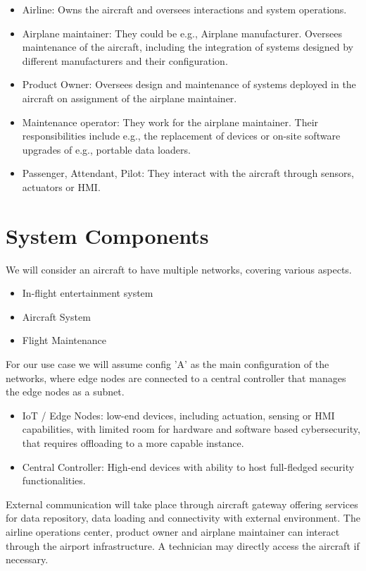 \begin{itemize}
	\item Airline:
	      Owns the aircraft and oversees interactions and system operations.
	\item Airplane maintainer: They could be e.g., Airplane manufacturer. Oversees maintenance of the aircraft,
	      including the integration of systems designed by different manufacturers and their configuration.
	\item Product Owner: Oversees design and maintenance of systems deployed in the aircraft on assignment of the
	      airplane maintainer.
	\item Maintenance operator: They work for the airplane maintainer. Their responsibilities include e.g.,
	      the replacement of devices or on-site software upgrades of e.g., portable data loaders.
	\item Passenger, Attendant, Pilot: They interact with the aircraft through sensors, actuators or HMI.
\end{itemize}

\section{System Components}

We will consider an aircraft to have multiple networks, covering various aspects.
\begin{itemize}
	\item In-flight entertainment system
	\item Aircraft System
	\item Flight Maintenance
\end{itemize}

For our use case we will assume config 'A' as the main configuration of the networks, where edge nodes are connected to
a central controller that manages the edge nodes as a subnet.
\begin{itemize}
	\item IoT / Edge Nodes: low-end devices, including actuation, sensing or HMI capabilities, with limited
	      room for hardware and software based cybersecurity, that requires offloading to a more capable
	      instance.
	\item Central Controller: High-end devices with ability to host full-fledged security functionalities.
\end{itemize}

External communication will take place through aircraft gateway offering services for data repository, data loading and
connectivity with external environment. The airline operations center, product owner and airplane maintainer can interact
through the airport infrastructure. A technician may directly access the aircraft if necessary.


